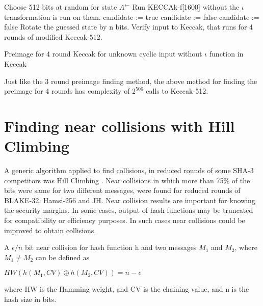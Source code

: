 \begin{algorithm}[H]
\begin{algorithmic}[1]
  \State Choose 512 bits at random for state $A^{\leftarrow}$
  \State Run KECCAk-f[1600] without the $\iota$ transformation is run on them.
    \State candidate := true
        \State candidate := false
      \EndIf
        \State candidate := false
      \EndIf
    \EndFor
      \State Rotate the guessed state by n bits.
      \State Verify input to Keccak, that runs for 4 rounds of modified Keccak-512.
    \EndIf
  \EndFor
\end{algorithmic}
\caption[Preimage for 4 round Keccak for unknown cyclic input without $\iota$ function in Keccak]
{Preimage for 4 round Keccak for unknown cyclic input without $\iota$ function in Keccak \cite{00022}}
\label{alg:seq}
\end{algorithm}

Just like the 3 round preimage finding method, the above method for finding the preimage for 4 rounds has complexity of
$2^{506}$ calls to Keccak-512.

\section{Finding near collisions with Hill Climbing}

A generic algorithm applied to find collisions, in reduced rounds of some SHA-3 competitors was Hill Climbing
\cite{00029}. Near collisions in which more than 75\% of the bits were same for two different messages, were found 
for reduced rounds of BLAKE-32, Hamsi-256 and JH. Near collision results are important for knowing the security
margins. In some cases, output of hash functions may be truncated for compatibility or efficiency purposes. In 
such cases near collisions could be improved to obtain collisions.

A $\epsilon / n $ bit near collision for hash function h and two messages $M_{1}$ and $M_{2}$, where $M_{1} \neq M_{2}$ can be 
defined as
\begin{center}$HW( h( M_{1}, CV ) \oplus h( M_{2}, CV ) ) = n - \epsilon $\end{center}
where HW is the Hamming weight, and CV is the chaining value, and n is the hash size in bits.

